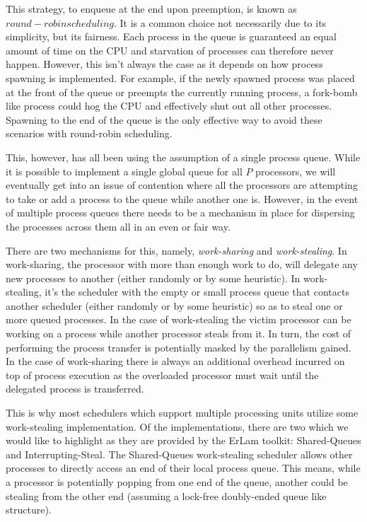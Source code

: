 This strategy, to enqueue at the end upon preemption, 
is known as $round-robin scheduling$. It is a common choice not
necessarily due to its simplicity, but its fairness. Each process in the queue
is guaranteed an equal amount of time on the CPU and starvation of processes
can therefore never happen. However, this isn't always the case as it depends
on how process spawning is implemented. For example, if the newly spawned
process was placed at the front of the queue or preempts the currently running
process, a fork-bomb like process could hog the CPU and effectively shut out
all other processes. Spawning to the end of the queue is the only effective way
to avoid these scenarios with round-robin scheduling.

This, however, has all been using the assumption of a single process queue. While
it is possible to implement a single global queue for all $P$ processors, we will
eventually get into an issue of contention where all the processors are 
attempting to take or add a process to the queue while another one is. However,
in the event of multiple process queues there needs to be a mechanism in place 
for dispersing the processes across them all in an even or fair way.

There are two mechanisms for this, namely, \emph{work-sharing} and
\emph{work-stealing}. In work-sharing, the processor with more than enough work
to do, will delegate any new processes to another (either randomly or by some
heuristic). In work-stealing, it's the scheduler with the empty or small
process queue that contacts another scheduler (either randomly or by some
heuristic) so as to steal one or more queued processes. In the case of
work-stealing the victim processor can be working on a process while another
processor steals from it. In turn, the cost of performing the process transfer
is potentially masked by the parallelism gained. In the case of work-sharing
there is always an additional overhead incurred on top of process execution as
the overloaded processor must wait until the delegated process is transferred.

This is why most schedulers which support multiple processing units utilize 
some work-stealing implementation. Of the implementations, there are two which 
we would like to highlight as they are provided by the ErLam toolkit: 
Shared-Queues and Interrupting-Steal. The Shared-Queues work-stealing scheduler
allows other processes to directly access an end of their local process queue. 
This means, while a processor is potentially popping from one end of the queue,
another could be stealing from the other end (assuming a lock-free doubly-ended 
queue like structure).


